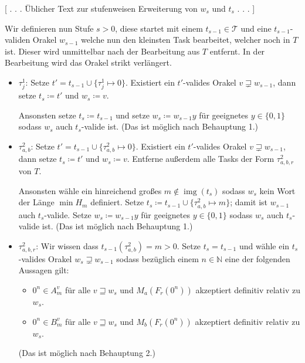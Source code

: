 \documentclass[nofonts]{uebung}
\DeclareMathOperator{\img}{img}
\begin{document}
[ . . . Üblicher Text zur stufenweisen Erweiterung von $w_s$ und $t_s$ . . . ]

Wir definieren nun Stufe $s>0$, diese startet mit einem $t_{s-1}\in\mathcal T$ und eine $t_{s-1}$-validen Orakel $w_{s-1}$ welche nun den kleinsten Task bearbeitet, welcher noch in $T$ ist. Dieser wird unmittelbar nach der Bearbeitung aus $T$ entfernt. In der Bearbeitung wird das Orakel strikt verlängert.
\begin{itemize}

    \item $\tau^1_j$: Setze $t'=t_{s-1}\cup\{\tau^1_j\mapsto 0\}$. Existiert ein $t'$-valides Orakel $v\sqsupsetneq w_{s-1}$, dann setze $t_s\coloneqq t'$ und $w_s\coloneqq v$.

        Ansonsten setze $t_s\coloneqq t_{s-1}$ und setze $w_s\coloneqq w_{s-1}y$ für geeignetes $y\in\{0,1\}$ sodass $w_s$ auch $t_s$-valide ist. (Das ist möglich nach Behauptung 1.)

    \item $\tau^2_{a,b}$: Setze $t'=t_{s-1}\cup\{\tau^2_{a,b}\mapsto 0\}$. Existiert ein $t'$-valides Orakel $v\sqsupsetneq w_{s-1}$, dann setze $t_s\coloneqq t'$ und $w_s\coloneqq v$. Entferne außerdem alle Tasks der Form $\tau^2_{a,b,r}$ von $T$.

        Ansonsten wähle ein hinreichend großes $m\not\in \img(t_s)$ sodass $w_s$ kein Wort der Länge $\min H_m$ definiert. Setze $t_s\coloneqq t_{s-1}\cup \{ \tau^2_{a,b}\mapsto m \}$; damit ist $w_{s-1}$ auch $t_s$-valide. Setze $w_s\coloneqq w_{s-1}y$ für geeignetes $y\in\{0,1\}$ sodass $w_s$ auch $t_s$-valide ist. (Das ist möglich nach Behauptung 1.)

    \item $\tau^2_{a,b,r}$: Wir wissen dass $t_{s-1}(\tau^2_{a,b})=m>0$. Setze $t_s=t_{s-1}$ und wähle ein $t_s$-valides Orakel $w_s\sqsupsetneq w_{s-1}$ sodass bezüglich einem $n\in\mathbb N$ eine der folgenden Aussagen gilt:
        \begin{itemize}[nosep,endpenalty=10000]
            \item $0^n\in A_m^v$ für alle $v\sqsupseteq w_s$ und $M_a(F_r(0^n))$ akzeptiert definitiv relativ zu $w_s$.
            \item $0^n\in B_m^v$ für alle $v\sqsupseteq w_s$ und $M_b(F_r(0^n))$ akzeptiert definitiv relativ zu $w_s$.
        \end{itemize} (Das ist möglich nach Behauptung 2.)


\end{itemize}
\end{document}
